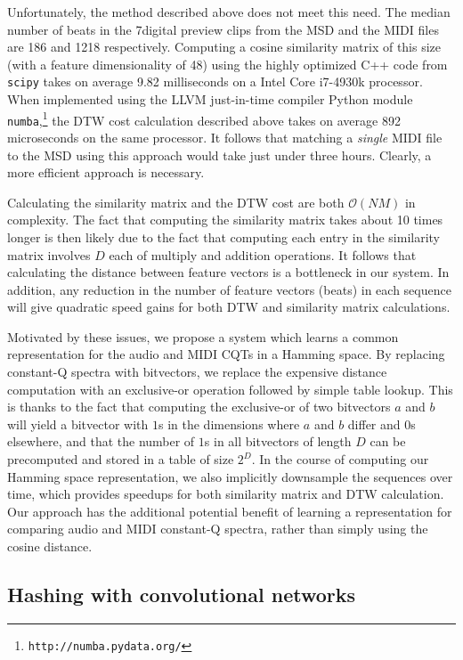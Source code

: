 \documentclass{article}
\begin{document}
Unfortunately, the method described above does not meet this need.
The median number of beats in the 7digital preview clips from the MSD and the MIDI files are 186 and 1218 respectively.
Computing a cosine similarity matrix of this size (with a feature dimensionality of 48) using the highly optimized C++ code from \texttt{scipy} \cite{jones2014scipy} takes on average 9.82 milliseconds on a Intel Core i7-4930k processor.
When implemented using the LLVM just-in-time compiler Python module \texttt{numba},\footnote{\texttt{http://numba.pydata.org/}} the DTW cost calculation described above takes on average 892 microseconds on the same processor.
It follows that matching a \textit{single} MIDI file to the MSD using this approach would take just under three hours.
Clearly, a more efficient approach is necessary.

Calculating the similarity matrix and the DTW cost are both $\mathcal{O}(NM)$ in complexity.
The fact that computing the similarity matrix takes about 10 times longer is then likely due to the fact that computing each entry in the similarity matrix involves $D$ each of multiply and addition operations.
It follows that calculating the distance between feature vectors is a bottleneck in our system.
In addition, any reduction in the number of feature vectors (beats) in each sequence will give quadratic speed gains for both DTW and similarity matrix calculations.

Motivated by these issues, we propose a system which learns a common representation for the audio and MIDI CQTs in a Hamming space.
By replacing constant-Q spectra with bitvectors, we replace the expensive distance computation with an exclusive-or operation followed by simple table lookup.
This is thanks to the fact that computing the exclusive-or of two bitvectors $a$ and $b$ will yield a bitvector with $1$s in the dimensions where $a$ and $b$ differ and $0$s elsewhere, and that the number of $1$s in all bitvectors of length $D$ can be precomputed and stored in a table of size $2^D$.
In the course of computing our Hamming space representation, we also implicitly downsample the sequences over time, which provides speedups for both similarity matrix and DTW calculation.
Our approach has the additional potential benefit of learning a representation for comparing audio and MIDI constant-Q spectra, rather than simply using the cosine distance.

\subsection{Hashing with convolutional networks}
\end{document}

